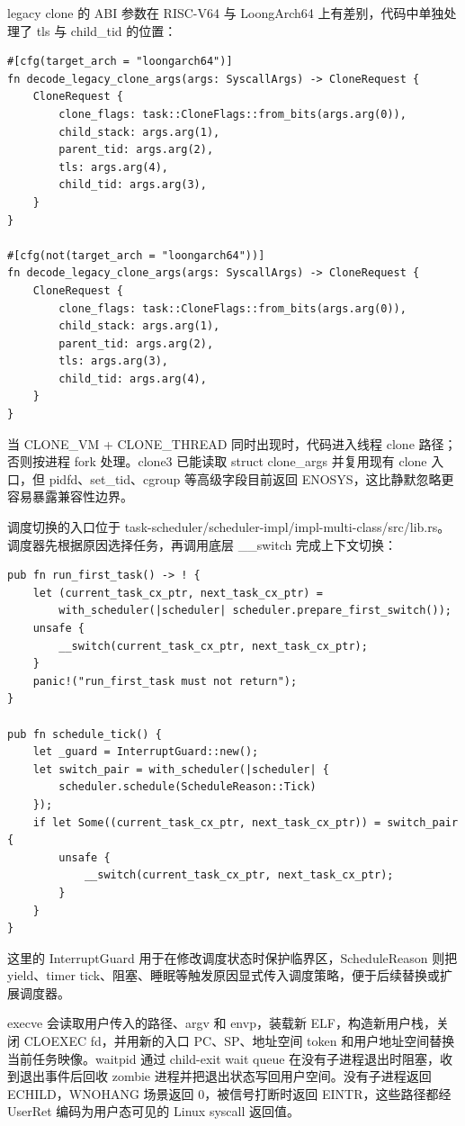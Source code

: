 \documentclass[12pt,openany,oneside,AutoFakeBold=true]{ctexbook}
\newcommand{\code}[1]{\textnormal{\rmfamily #1}}
\newcommand{\syscall}[1]{\textnormal{\rmfamily #1}}
\begin{document}
legacy \syscall{clone} 的 ABI 参数在 RISC-V64 与 LoongArch64 上有差别，代码中单独处理了 \code{tls} 与 \code{child\_tid} 的位置：

\begin{lstlisting}
#[cfg(target_arch = "loongarch64")]
fn decode_legacy_clone_args(args: SyscallArgs) -> CloneRequest {
    CloneRequest {
        clone_flags: task::CloneFlags::from_bits(args.arg(0)),
        child_stack: args.arg(1),
        parent_tid: args.arg(2),
        tls: args.arg(4),
        child_tid: args.arg(3),
    }
}

#[cfg(not(target_arch = "loongarch64"))]
fn decode_legacy_clone_args(args: SyscallArgs) -> CloneRequest {
    CloneRequest {
        clone_flags: task::CloneFlags::from_bits(args.arg(0)),
        child_stack: args.arg(1),
        parent_tid: args.arg(2),
        tls: args.arg(3),
        child_tid: args.arg(4),
    }
}
\end{lstlisting}

当 \code{CLONE\_VM + CLONE\_THREAD} 同时出现时，代码进入线程 clone 路径；否则按进程 fork 处理。\code{clone3} 已能读取 \code{struct clone\_args} 并复用现有 clone 入口，但 \code{pidfd}、\code{set\_tid}、\code{cgroup} 等高级字段目前返回 \code{ENOSYS}，这比静默忽略更容易暴露兼容性边界。

调度切换的入口位于 \code{task-scheduler/scheduler-impl/impl-multi-class/src/lib.rs}。调度器先根据原因选择任务，再调用底层 \code{\_\_switch} 完成上下文切换：

\begin{lstlisting}
pub fn run_first_task() -> ! {
    let (current_task_cx_ptr, next_task_cx_ptr) =
        with_scheduler(|scheduler| scheduler.prepare_first_switch());
    unsafe {
        __switch(current_task_cx_ptr, next_task_cx_ptr);
    }
    panic!("run_first_task must not return");
}

pub fn schedule_tick() {
    let _guard = InterruptGuard::new();
    let switch_pair = with_scheduler(|scheduler| {
        scheduler.schedule(ScheduleReason::Tick)
    });
    if let Some((current_task_cx_ptr, next_task_cx_ptr)) = switch_pair {
        unsafe {
            __switch(current_task_cx_ptr, next_task_cx_ptr);
        }
    }
}
\end{lstlisting}

这里的 \code{InterruptGuard} 用于在修改调度状态时保护临界区，\code{ScheduleReason} 则把 yield、timer tick、阻塞、睡眠等触发原因显式传入调度策略，便于后续替换或扩展调度器。

\syscall{execve} 会读取用户传入的路径、argv 和 envp，装载新 ELF，构造新用户栈，关闭 \code{CLOEXEC} fd，并用新的入口 PC、SP、地址空间 token 和用户地址空间替换当前任务映像。\syscall{waitpid} 通过 child-exit wait queue 在没有子进程退出时阻塞，收到退出事件后回收 zombie 进程并把退出状态写回用户空间。没有子进程返回 \code{ECHILD}，\code{WNOHANG} 场景返回 0，被信号打断时返回 \code{EINTR}，这些路径都经 \code{UserRet} 编码为用户态可见的 Linux syscall 返回值。
\end{document}
